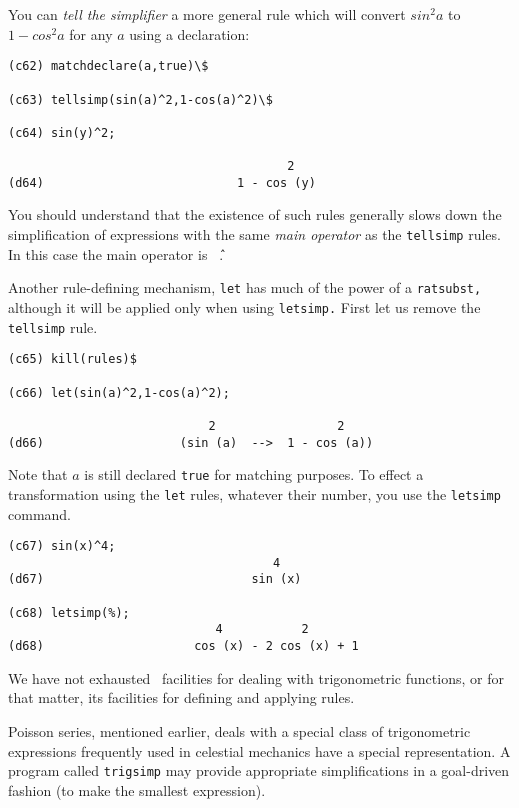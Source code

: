 You can {\it tell the simplifier}
a more general rule which will convert $ sin^2 a $ to
$ 1 - cos^2 a $ for any $a$ using a
declaration:
\begin{verbatim}
(c62) matchdeclare(a,true)\$

(c63) tellsimp(sin(a)^2,1-cos(a)^2)\$

(c64) sin(y)^2;

                                       2
(d64)                           1 - cos (y)
\end{verbatim}

You should understand that the existence of such
rules generally slows down the simplification of expressions with the same
{\it main operator} as the {\tt tellsimp} rules.  In this case the main 
operator is {\tt \^\ }.

Another rule-defining mechanism, {\tt let} has much of the power of a 
{\tt ratsubst,} although it will be applied only when using {\tt letsimp.}
First let us remove the {\tt tellsimp} rule.
\begin{verbatim}
(c65) kill(rules)$

(c66) let(sin(a)^2,1-cos(a)^2);

                            2                 2
(d66)                   (sin (a)  -->  1 - cos (a))
\end{verbatim}

Note that $a$ is still declared 
{\tt true}
for matching
purposes.  To effect a transformation using the
{\tt let}
rules, whatever their number, you use the {\tt letsimp}
command.
\begin{verbatim}
(c67) sin(x)^4;
                                     4
(d67)                             sin (x)

(c68) letsimp(%);
                             4           2
(d68)                     cos (x) - 2 cos (x) + 1
\end{verbatim}

We have not exhausted 
\Max\
facilities for
dealing with trigonometric functions, or for that matter, its
facilities for defining and applying rules.

Poisson series, mentioned earlier, deals with a special class of
trigonometric expressions frequently used in celestial
mechanics have a special representation. A program called
{\tt trigsimp}
may provide appropriate simplifications in a goal-driven fashion
(to make the smallest expression). 
